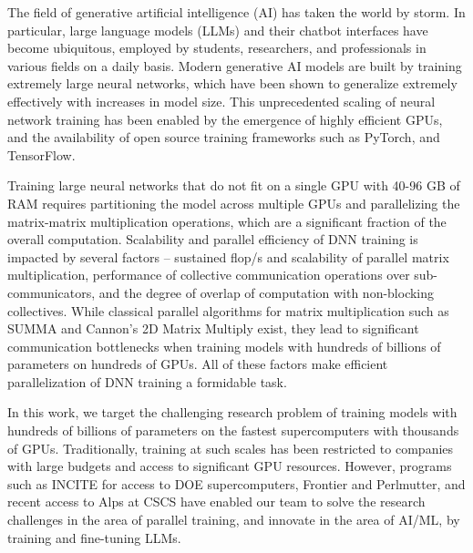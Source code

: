 

The field of generative artificial intelligence (AI) has taken the world by
storm. In particular, large language models (LLMs) and their chatbot interfaces
have become ubiquitous, employed by students, researchers, and professionals in
various fields on a daily basis. Modern generative AI models are built by
training extremely large neural networks, which have been shown to generalize
extremely effectively with increases in model size. This unprecedented scaling of
neural network training has been enabled by the emergence of highly efficient
GPUs, and the availability of open source training frameworks such as PyTorch,
and TensorFlow.

Training large neural networks that
do not fit on a single GPU with 40-96 GB of RAM requires partitioning the model
across multiple GPUs and parallelizing the matrix-matrix multiplication
operations, which are a significant fraction of the overall computation.
Scalability and parallel efficiency of DNN training is impacted by several
factors -- sustained flop/s and scalability of parallel matrix multiplication,
performance of collective communication operations over sub-communicators, and
the degree of overlap of computation with non-blocking collectives. While
classical parallel algorithms for matrix multiplication such as SUMMA and
Cannon's 2D Matrix Multiply exist, they lead to significant communication
bottlenecks when training models with hundreds of billions of parameters on
hundreds of GPUs. All of these factors make efficient parallelization of DNN
training a formidable task.

In this work, we target the challenging research problem of training models
with hundreds of billions of parameters on the fastest supercomputers with
thousands of GPUs. Traditionally, training at such scales has been restricted
to companies with large budgets and access to significant GPU resources.
However, programs such as INCITE for access to DOE supercomputers, 
Frontier and Perlmutter, and recent access to Alps at CSCS have
enabled our team to solve the research challenges in the area of parallel
training, and innovate in the area of AI/ML, by training and
fine-tuning LLMs.

